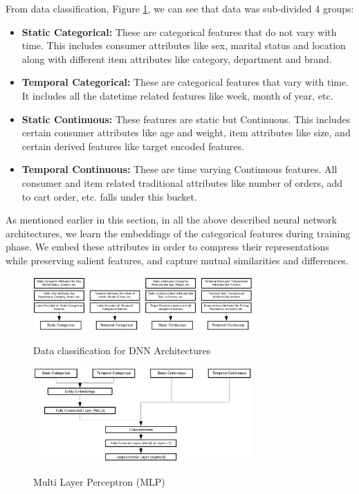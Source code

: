From data classification, Figure \ref{fig:dnndata}, we can see that data was sub-divided 4 groups:
\begin{itemize}
\item {\bf Static Categorical:} These are categorical features that do not vary with time. This includes consumer
attributes like sex, marital status and location along with different item attributes like category, department and brand.
\item {\bf Temporal Categorical:} These are categorical features that vary with time. It includes all the datetime 
related features like week, month of year, etc.
\item {\bf Static Continuous:} These features are static but Continuous. This includes certain consumer attributes like
age and weight, item attributes like size, and certain derived features like target encoded features.
\item {\bf Temporal Continuous:} These are time varying Continuous features. All consumer and item related
traditional attributes like number of orders, add to cart order, etc. falls under this bucket.
\end{itemize}
As mentioned earlier in this section, in all the above described neural network architectures, we learn the embeddings \cite{guo2016entity} of the 
categorical features during training phase. We embed these attributes in order to compress their representations 
while preserving salient features, and capture mutual similarities and differences.
  \begin{figure}[t]
    \centering 
    \caption{Data classification for DNN Architectures} 
    \includegraphics[width=3.3in]{img/dnndata.png} 
    \label{fig:dnndata} 
  \end{figure}
  \begin{figure}[t]
    \centering 
    \caption{Multi Layer Perceptron (MLP)} 
    \includegraphics[width=3.3in]{img/MLP.png} 
    \label{fig:MLP} 
  \end{figure}

